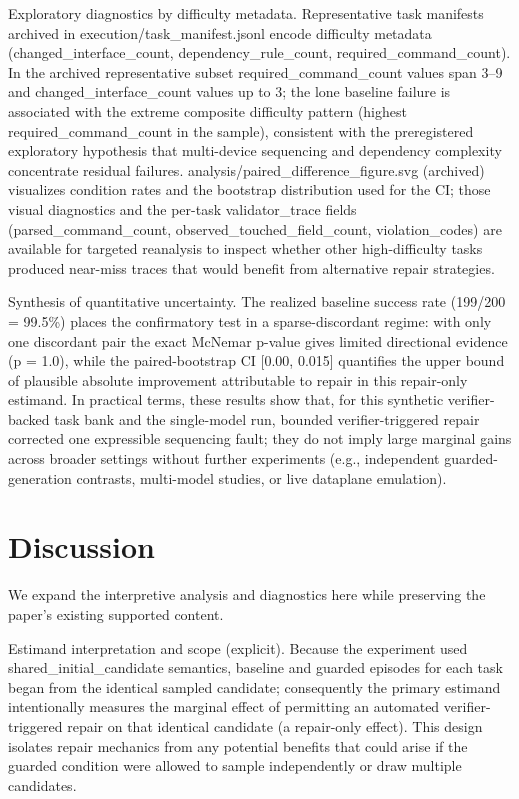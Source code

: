 \documentclass[conference]{IEEEtran}
\begin{document}
Exploratory diagnostics by difficulty metadata. Representative task manifests archived in execution/task\_manifest.jsonl encode difficulty metadata (changed\_interface\_count, dependency\_rule\_count, required\_command\_count). In the archived representative subset required\_command\_count values span 3--9 and changed\_interface\_count values up to 3; the lone baseline failure is associated with the extreme composite difficulty pattern (highest required\_command\_count in the sample), consistent with the preregistered exploratory hypothesis that multi-device sequencing and dependency complexity concentrate residual failures. analysis/paired\_difference\_figure.svg (archived) visualizes condition rates and the bootstrap distribution used for the CI; those visual diagnostics and the per-task validator\_trace fields (parsed\_command\_count, observed\_touched\_field\_count, violation\_codes) are available for targeted reanalysis to inspect whether other high-difficulty tasks produced near-miss traces that would benefit from alternative repair strategies.

Synthesis of quantitative uncertainty. The realized baseline success rate (199/200 = 99.5\%) places the confirmatory test in a sparse-discordant regime: with only one discordant pair the exact McNemar p-value gives limited directional evidence (p = 1.0), while the paired-bootstrap CI [0.00, 0.015] quantifies the upper bound of plausible absolute improvement attributable to repair in this repair-only estimand. In practical terms, these results show that, for this synthetic verifier-backed task bank and the single-model run, bounded verifier-triggered repair corrected one expressible sequencing fault; they do not imply large marginal gains across broader settings without further experiments (e.g., independent guarded-generation contrasts, multi-model studies, or live dataplane emulation).

\section{Discussion}
We expand the interpretive analysis and diagnostics here while preserving the paper's existing supported content.

Estimand interpretation and scope (explicit). Because the experiment used shared\_initial\_candidate semantics, baseline and guarded episodes for each task began from the identical sampled candidate; consequently the primary estimand intentionally measures the marginal effect of permitting an automated verifier-triggered repair on that identical candidate (a repair-only effect). This design isolates repair mechanics from any potential benefits that could arise if the guarded condition were allowed to sample independently or draw multiple candidates.
\end{document}
